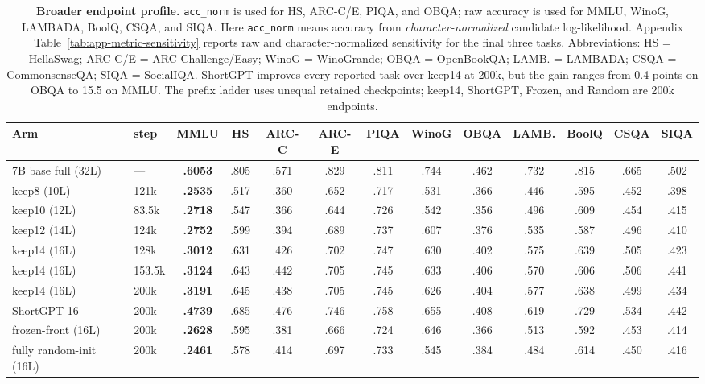 \begin{table}[t]
\centering
\scriptsize
\setlength{\tabcolsep}{2.2pt}
\begin{tabular}{@{}llccccccccccc@{}}
\toprule
\textbf{Arm} & \textbf{step} & \textbf{MMLU} & \textbf{HS} &
\textbf{ARC-C} & \textbf{ARC-E} & \textbf{PIQA} & \textbf{WinoG} &
\textbf{OBQA} & \textbf{LAMB.} & \textbf{BoolQ} & \textbf{CSQA} &
\textbf{SIQA} \\
\midrule
7B base full (32L)       & ---    & \textbf{.6053} & .805 & .571 & .829 & .811 & .744 & .462 & .732 & .815 & .665 & .502 \\
keep8 (10L)              & 121k   & \textbf{.2535} & .517 & .360 & .652 & .717 & .531 & .366 & .446 & .595 & .452 & .398 \\
keep10 (12L)             & 83.5k  & \textbf{.2718} & .547 & .366 & .644 & .726 & .542 & .356 & .496 & .609 & .454 & .415 \\
keep12 (14L)             & 124k   & \textbf{.2752} & .599 & .394 & .689 & .737 & .607 & .376 & .535 & .587 & .496 & .410 \\
keep14 (16L)             & 128k   & \textbf{.3012} & .631 & .426 & .702 & .747 & .630 & .402 & .575 & .639 & .505 & .423 \\
keep14 (16L)             & 153.5k & \textbf{.3124} & .643 & .442 & .705 & .745 & .633 & .406 & .570 & .606 & .506 & .441 \\
keep14 (16L)             & 200k   & \textbf{.3191} & .645 & .438 & .705 & .745 & .626 & .404 & .577 & .638 & .499 & .434 \\
ShortGPT-16              & 200k   & \textbf{.4739} & .685 & .476 & .746 & .758 & .655 & .408 & .619 & .729 & .534 & .442 \\
frozen-front (16L)       & 200k   & \textbf{.2628} & .595 & .381 & .666 & .724 & .646 & .366 & .513 & .592 & .453 & .414 \\
fully random-init (16L)  & 200k   & \textbf{.2461} & .578 & .414 & .697 & .733 & .545 & .384 & .484 & .614 & .450 & .416 \\
\bottomrule
\end{tabular}
\caption{\textbf{Broader endpoint profile.}
\texttt{acc\_norm} is used for HS, ARC-C/E, PIQA, and OBQA; raw accuracy is
used for MMLU, WinoG, LAMBADA, BoolQ, CSQA, and SIQA. Here
\texttt{acc\_norm} means accuracy from \emph{character-normalized} candidate
log-likelihood. Appendix Table~\ref{tab:app-metric-sensitivity} reports raw
and character-normalized sensitivity for the final three tasks. Abbreviations: HS = HellaSwag;
ARC-C/E = ARC-Challenge/Easy; WinoG = WinoGrande; OBQA = OpenBookQA; LAMB. =
LAMBADA; CSQA = CommonsenseQA; SIQA = SocialIQA. ShortGPT improves every
reported task over keep14 at 200k, but the gain ranges from 0.4 points on OBQA
to 15.5 on MMLU. The prefix ladder uses unequal retained checkpoints; keep14,
ShortGPT, Frozen, and Random are 200k endpoints.}
\label{tab:downstream}
\end{table}
